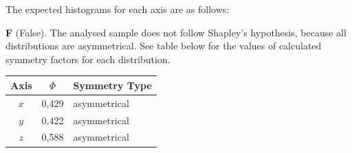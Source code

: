 \begin{description}
  The expected histograms for each axis are as follows:
\item[(d)] \textbf{F} (False). The analysed sample does not follow Shapley's
  hypothesis, because all distributions are asymmetrical. See table below for
  the values of calculated symmetry factors for each distribution.

  \begin{center}
  \begin{tabular}{|c|c|l|}
  \hline
  \textbf{Axis} & $\Phi$ & \textbf{Symmetry Type}\\
  \hline
  $x$ & 0,429 & asymmetrical\\ %
  $y$ & 0,422 & asymmetrical\\
  $z$ & 0,588 & asymmetrical\\
  \hline
  \end{tabular}
  \end{center}
\end{description}
